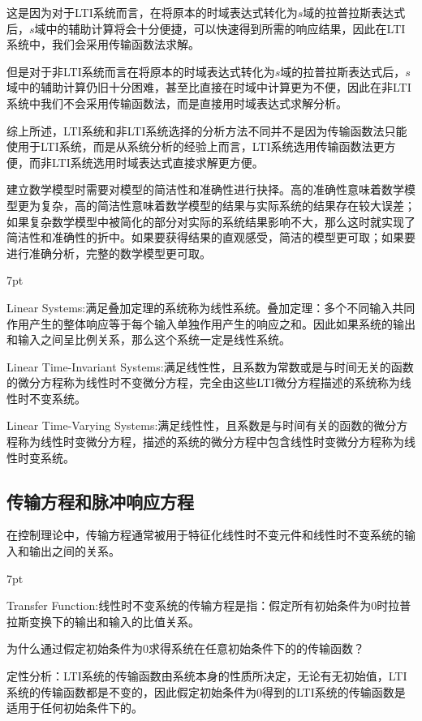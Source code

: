 \documentclass{article}
\numberwithin{equation}{section}
\numberwithin{figure}{section}
\newenvironment{formal}{%
\def\FrameCommand{%
\hspace{1pt}%
{\color{DarkBlue}\vrule width 2pt}%
{\color{formalshade}\vrule width 4pt}%
\colorbox{formalshade}%
}%
\MakeFramed{\advance\hsize-\width\FrameRestore}%
\noindent\hspace{-4.55pt}%
\begin{adjustwidth}{}{7pt}%
\vspace{2pt}\vspace{2pt}%
}
{%
\vspace{2pt}\end{adjustwidth}\endMakeFramed%
}
\begin{document}
这是因为对于LTI系统而言，在将原本的时域表达式转化为$s$域的拉普拉斯表达式后，$s$域中的辅助计算将会十分便捷，可以快速得到所需的响应结果，因此在LTI系统中，我们会采用传输函数法求解。

但是对于非LTI系统而言在将原本的时域表达式转化为$s$域的拉普拉斯表达式后，$s$域中的辅助计算仍旧十分困难，甚至比直接在时域中计算更为不便，因此在非LTI系统中我们不会采用传输函数法，而是直接用时域表达式求解分析。

综上所述，LTI系统和非LTI系统选择的分析方法不同并不是因为传输函数法只能使用于LTI系统，而是从系统分析的经验上而言，LTI系统选用传输函数法更方便，而非LTI系统选用时域表达式直接求解更方便。

建立数学模型时需要对模型的简洁性和准确性进行抉择。高的准确性意味着数学模型更为复杂，高的简洁性意味着数学模型的结果与实际系统的结果存在较大误差；如果复杂数学模型中被简化的部分对实际的系统结果影响不大，那么这时就实现了简洁性和准确性的折中。如果要获得结果的直观感受，简洁的模型更可取；如果要进行准确分析，完整的数学模型更可取。

\begin{formal}
    \item Linear Systems:满足叠加定理的系统称为线性系统。叠加定理：多个不同输入共同作用产生的整体响应等于每个输入单独作用产生的响应之和。因此如果系统的输出和输入之间呈比例关系，那么这个系统一定是线性系统。
    \item Linear Time-Invariant Systems:满足线性性，且系数为常数或是与时间无关的函数的微分方程称为线性时不变微分方程，完全由这些LTI微分方程描述的系统称为线性时不变系统。
    \item Linear Time-Varying Systems:满足线性性，且系数是与时间有关的函数的微分方程称为线性时变微分方程，描述的系统的微分方程中包含线性时变微分方程称为线性时变系统。
    \item 
\end{formal}
\subsection{传输方程和脉冲响应方程}
在控制理论中，传输方程通常被用于特征化线性时不变元件和线性时不变系统的输入和输出之间的关系。
\begin{formal}  
    Transfer Function:线性时不变系统的传输方程是指：假定所有初始条件为0时拉普拉斯变换下的输出和输入的比值关系。
\end{formal}

为什么通过假定初始条件为0求得系统在任意初始条件下的的传输函数？

定性分析：LTI系统的传输函数由系统本身的性质所决定，无论有无初始值，LTI系统的传输函数都是不变的，因此假定初始条件为0得到的LTI系统的传输函数是适用于任何初始条件下的。
\end{document}
